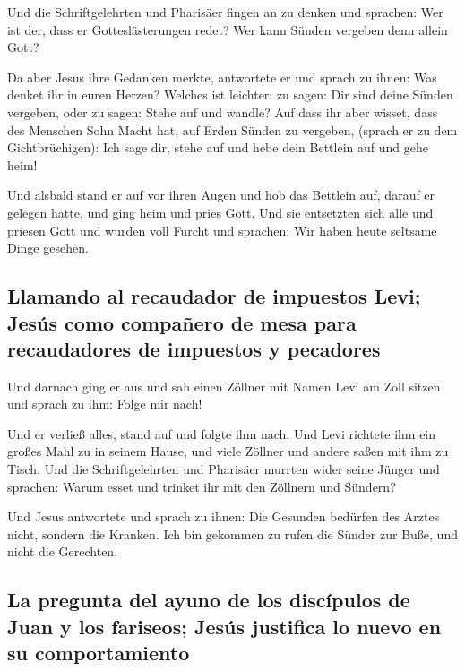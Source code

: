  Und die Schriftgelehrten und Pharisäer fingen an zu
denken und sprachen: Wer ist der, dass er Gotteslästerungen redet? Wer
kann Sünden vergeben denn allein Gott?

 Da aber Jesus ihre Gedanken merkte, antwortete er und
sprach zu ihnen: Was denket ihr in euren Herzen?  Welches
ist leichter: zu sagen: Dir sind deine Sünden vergeben, oder zu sagen:
Stehe auf und wandle?  Auf dass ihr aber wisset, dass des
Menschen Sohn Macht hat, auf Erden Sünden zu vergeben, (sprach er zu dem
Gichtbrüchigen): Ich sage dir, stehe auf und hebe dein Bettlein auf und
gehe heim!

 Und alsbald stand er auf vor ihren Augen und hob das
Bettlein auf, darauf er gelegen hatte, und ging heim und pries Gott.
 Und sie entsetzten sich alle und priesen Gott und wurden
voll Furcht und sprachen: Wir haben heute seltsame Dinge gesehen.

\hypertarget{llamando-al-recaudador-de-impuestos-levi-jesuxfas-como-compauxf1ero-de-mesa-para-recaudadores-de-impuestos-y-pecadores}{%
\subsection{Llamando al recaudador de impuestos Levi; Jesús como
compañero de mesa para recaudadores de impuestos y
pecadores}\label{llamando-al-recaudador-de-impuestos-levi-jesuxfas-como-compauxf1ero-de-mesa-para-recaudadores-de-impuestos-y-pecadores}}

 Und darnach ging er aus und sah einen Zöllner mit Namen
Levi am Zoll sitzen und sprach zu ihm: Folge mir nach!

 Und er verließ alles, stand auf und folgte ihm nach.
 Und Levi richtete ihm ein großes Mahl zu in seinem
Hause, und viele Zöllner und andere saßen mit ihm zu Tisch.
 Und die Schriftgelehrten und Pharisäer murrten wider
seine Jünger und sprachen: Warum esset und trinket ihr mit den Zöllnern
und Sündern?

 Und Jesus antwortete und sprach zu ihnen: Die Gesunden
bedürfen des Arztes nicht, sondern die Kranken.  Ich bin
gekommen zu rufen die Sünder zur Buße, und nicht die Gerechten.

\hypertarget{la-pregunta-del-ayuno-de-los-discuxedpulos-de-juan-y-los-fariseos-jesuxfas-justifica-lo-nuevo-en-su-comportamiento}{%
\subsection{La pregunta del ayuno de los discípulos de Juan y los
fariseos; Jesús justifica lo nuevo en su
comportamiento}\label{la-pregunta-del-ayuno-de-los-discuxedpulos-de-juan-y-los-fariseos-jesuxfas-justifica-lo-nuevo-en-su-comportamiento}}

